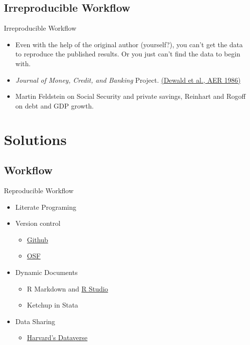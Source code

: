 \documentclass{beamer}
\begin{document}
 
\subsection{Irreproducible Workflow}
 \begin{frame}{Irreproducible Workflow}
 \begin{itemize}
 \item
  Even with the help of the original author (yourself?), you can't get the data to reproduce the published results. Or you just can't find the data to begin with. 
  \item \textit{Journal of Money, Credit, and Banking} Project. \href{http://www.jstor.org/stable/1806061}{(Dewald et al., AER 1986)}
   \item Martin Feldstein on Social Security and private savings, Reinhart and Rogoff on debt and GDP growth.
 \end{itemize} 
 \end{frame}

\section{Solutions}


\subsection{Workflow}
\begin{frame}{Reproducible Workflow}
 \begin{itemize}
 \item Literate Programing 
 \item Version control
 \begin{itemize}
 \item \href{http://www.github.com}{Github}
 \item \href{http://osf.io}{OSF}
 \end{itemize}
 \item Dynamic Documents
 \begin{itemize}
  \item R Markdown and \href{http://rstudio.com}{R Studio}
  \item Ketchup in Stata
 \end{itemize}
 \item Data Sharing
 \begin{itemize}
 \item \href{http://www.thedata.org}{Harvard's Dataverse}
 \end{itemize}
\end{itemize}
\end{frame}
\end{document}
